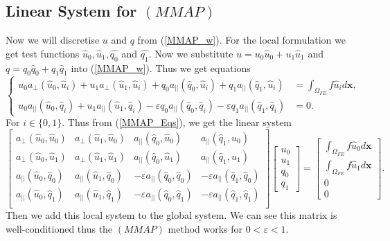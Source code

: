 \documentclass[12pt]{ociamthesis}
\begin{document}
\subsection{Linear System for $(MMAP)$}
Now we will discretise $u$ and  $q$ from (\ref{MMAP_w}). For the local formulation we get test functions $\hat{u}_0, \hat{u}_1, \hat{q_0}$ and $\hat{q_1}$. Now we substitute $u = u_0 \hat{u}_0 + u_1\hat{u}_1$ and $q = q_0\hat{q}_0 + q_1\hat{q}_1$ into (\ref{MMAP_w}). Thus we get equations
\begin{equation} \label{MMAP_Eqs}
\begin{cases}
u_0a_{\perp}(\hat{u}_0, \hat{u}_i) +
u_1a_{\perp}(\hat{u}_1, \hat{u}_i) +
q_0a_{||}(\hat{q}_0, \hat{u}_i) +
q_1a_{||}(\hat{q}_1, \hat{u}_i) &=
\int_{\Omega_{FE}} f \hat{u}_i d\mathbf{x}, \\
u_0a_{||}(\hat{u}_0, \hat{q}_i) +
u_1a_{||}(\hat{u}_1, \hat{q}_i) -
\varepsilon q_0a_{||}(\hat{q}_0, \hat{q}_i) -
\varepsilon q_1a_{||}(\hat{q}_1, \hat{q}_i) &=
0.
\end{cases}
\end{equation}
For $i\in\{0,1\}$. Thus from (\ref{MMAP_Eqs}), we get the linear system
\begin{equation}
\left [
\begin{matrix}
a_{\perp}(\hat{u}_0, \hat{u}_0) &
a_{\perp}(\hat{u}_1, \hat{u}_0) &
a_{||}(\hat{q}_0, \hat{u}_0) &
a_{||}(\hat{q}_1, \hat{u}_0) \\
a_{\perp}(\hat{u}_0, \hat{u}_1) &
a_{\perp}(\hat{u}_1, \hat{u}_1) &
a_{||}(\hat{q}_0, \hat{u}_1) &
a_{||}(\hat{q}_1, \hat{u}_1) \\
a_{||}(\hat{u}_0, \hat{q}_0) &
a_{||}(\hat{u}_1, \hat{q}_0) &
-\varepsilon a_{||}(\hat{q}_0, \hat{q}_0) &
-\varepsilon a_{||}(\hat{q}_1, \hat{q}_0) \\
a_{||}(\hat{u}_0, \hat{q}_1) &
a_{||}(\hat{u}_1, \hat{q}_1) &
-\varepsilon a_{||}(\hat{q}_0, \hat{q}_1) &
-\varepsilon a_{||}(\hat{q}_1, \hat{q}_1) \\
\end{matrix}
\right ]
\left [
\begin{matrix}
u_0 \\
u_1 \\
q_0 \\
q_1
\end{matrix}
\right ] =
\left [
\begin{matrix}
\int_{\Omega_{FE}}f\hat{u}_0 d \mathbf{x} \\
\int_{\Omega_{FE}}f\hat{u}_1 d \mathbf{x} \\
0 \\
0
\end{matrix}
\right ].
\end{equation}
Then we add this local system to the global system. We can see this matrix is well-conditioned thus the $(MMAP)$ method works for $0<\varepsilon<1$.
\end{document}
